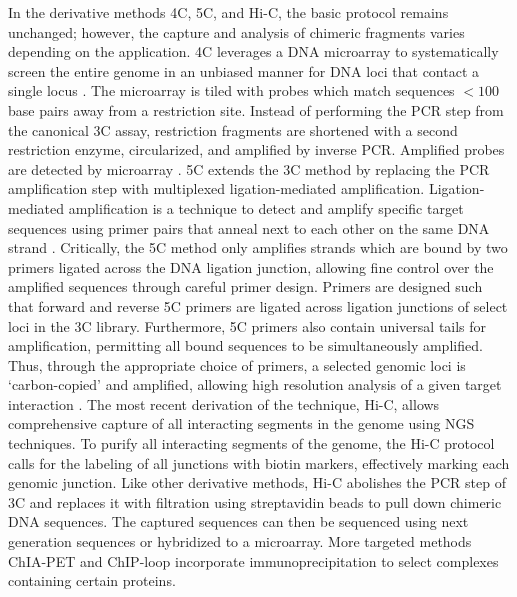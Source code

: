 In the derivative methods 4C, 5C, and Hi-C, the basic protocol remains unchanged; however, the capture and analysis of chimeric fragments varies
depending on the application.  \gls{4C} leverages a DNA microarray to systematically screen the entire genome in an unbiased manner for DNA loci
that contact a single locus \citep{simonis2006}.  The microarray is tiled with probes which match sequences $< 100$ base pairs away from a
restriction site.  Instead of performing the PCR step from the canonical \gls{3C} assay, restriction fragments are shortened with a
second restriction enzyme, circularized, and amplified by inverse PCR\@.  Amplified probes are detected by microarray \citep{simonis2006}.
\gls{5C} extends the \gls{3C} method by replacing the PCR amplification step with multiplexed ligation-mediated amplification.  Ligation-mediated
amplification is a technique to detect and amplify specific target sequences using primer pairs that anneal next to each other on the
same DNA strand \citep{dostie2006}. Critically, the 5C method only amplifies strands which are bound by two primers ligated across the DNA ligation
junction, allowing fine control over the amplified sequences through careful primer design.  Primers are designed such that forward and
reverse \gls{5C} primers are ligated across ligation junctions of select loci in the \gls{3C} library.  Furthermore, \gls{5C} primers also
contain universal tails for amplification, permitting all bound sequences to be simultaneously amplified.  Thus, through the appropriate choice of
primers, a selected genomic loci is `carbon-copied' and amplified, allowing high resolution analysis of a given target interaction \citep{dostie2006}.
The most recent derivation of the technique, Hi-C, allows comprehensive capture of all interacting segments in the genome using \gls{NGS} techniques.
To purify all interacting segments of the genome, the Hi-C protocol calls for the labeling of all junctions with biotin markers, effectively
marking each genomic junction. Like other derivative methods, Hi-C abolishes the PCR step of \gls{3C} and replaces it with filtration using
streptavidin beads to pull down chimeric DNA sequences.  The captured sequences can then be sequenced using next generation sequences or hybridized
to a microarray.  More targeted methods ChIA-PET and ChIP-loop incorporate immunoprecipitation to select complexes containing certain proteins.

